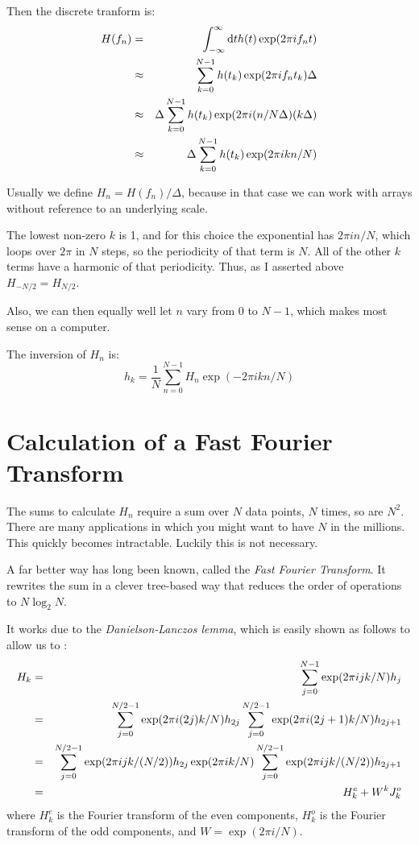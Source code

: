Then the discrete tranform is:
\begin{eqnarray}
H(f_n) &=& \int_{-\infty}^{\infty} {\rm d}t h(t) \exp(2\pi i f_n t) \cr
&\approx& \sum_{k=0}^{N-1} h(t_k) \exp(2\pi i f_n t_k) \Delta \cr
&\approx& \Delta \sum_{k=0}^{N-1} h(t_k) \exp(2\pi i (n / N\Delta)
(k\Delta) \cr
&\approx& \Delta \sum_{k=0}^{N-1} h(t_k) \exp(2\pi i k n / N)
\end{eqnarray}

Usually we define $H_n = H(f_n) / \Delta$, because in that case we can
work with arrays without reference to an underlying scale.


\begin{answer}
The lowest non-zero $k$ is 1, and for this choice the exponential has
$2\pi i n/N$, which loops over $2\pi$ in $N$ steps, so the periodicity
of that term is $N$. All of the other $k$ terms have a harmonic of
that periodicity. Thus, as I asserted above $H_{-N/2} = H_{N/2}$.

Also, we can then equally well let $n$ vary from $0$ to $N-1$, which
makes most sense on a computer.
\end{answer}

The inversion of $H_n$ is:
\begin{equation}
h_k = \frac{1}{N} \sum_{n=0}^{N-1} H_n \exp(-2\pi i k n/N)
\end{equation}

\section{Calculation of a Fast Fourier Transform}


\begin{answer}
The sums to calculate $H_n$ require a sum over $N$ data points, $N$
times, so are $N^2$. There are many applications in which you might
want to have $N$ in the millions. This quickly becomes
intractable. Luckily this is not necessary.
\end{answer}

A far better way has long been known, called the {\it Fast Fourier
  Transform}. It rewrites the sum in a clever tree-based way that
reduces the order of operations to $N\log_2 N$.

It works due to the {\it Danielson-Lanczos lemma}, which is easily
shown as follows to allow us to :
\begin{eqnarray}
H_k &=& \sum_{j=0}^{N-1} \exp(2\pi i jk /N) h_j \cr
&=& \sum_{j=0}^{N/2-1} \exp(2\pi i (2j) k /N) h_{2j} 
\sum_{j=0}^{N/2-1} \exp(2\pi i (2j + 1) k /N) h_{2j+1} \cr
&=& \sum_{j=0}^{N/2-1} \exp(2\pi i j k / (N/2)) h_{2j} 
\exp(2\pi i k /N) \sum_{j=0}^{N/2-1} \exp(2\pi i j k / (N/2)) h_{2j+1} \cr
&=& H_k^e + W^k J_k^o
\end{eqnarray}
where $H_k^e$ is the Fourier transform of the even components, $H_k^o$
is the Fourier transform of the odd components, and $W=\exp(2\pi i
/N)$. 


